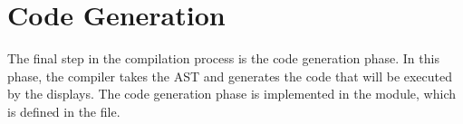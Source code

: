 \section{Code Generation}

The final step in the compilation process is the code generation phase. In this phase, the compiler takes the AST and generates the  code that will be executed by the  displays. The code generation phase is implemented in the  module, which is defined in the  file.
